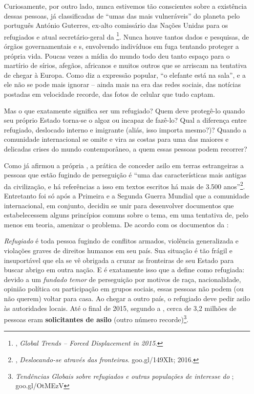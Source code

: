 Curiosamente, por outro lado, nunca estivemos tão conscientes sobre a
existência dessas pessoas, já classificadas de ``umas das mais
vulneráveis'' do planeta pelo português António Guterres, ex-alto
comissário das Nações Unidas para os refugiados e atual secretário-geral
da \footnote{, \emph{Global Trends -- Forced Displacement in
  2015}.}.  Nunca houve tantos dados e pesquisas, de órgãos
governamentais e s, envolvendo indivíduos em fuga tentando proteger a
própria vida. Poucas vezes a mídia do mundo todo deu tanto espaço para o
martírio de sírios, afegãos, africanos e muitos outros que se arriscam
na tentativa de chegar à Europa. Como diz a expressão popular, ``o
elefante está na sala'', e a ele não se pode mais ignorar -- ainda mais
na era das redes sociais, das notícias postadas em velocidade recorde,
das fotos de celular que tudo captam.

Mas o que exatamente significa ser um refugiado? Quem deve protegê-lo
quando seu próprio Estado torna-se o algoz ou incapaz de fazê-lo? Qual a
diferença entre refugiado, deslocado interno e imigrante (aliás, isso
importa mesmo?)? Quando a comunidade internacional se omite e vira as
costas para uma das maiores e delicadas crises do mundo contemporâneo, a
quem essas pessoas podem recorrer?

Como já afirmou a própria , a prática de conceder asilo em terras
estrangeiras a pessoas que estão fugindo de perseguição é ``uma das
características mais antigas da civilização, e há referências a isso em
textos escritos há mais de 3.500 anos''\footnote{,
  \emph{Deslocando-se através das fronteiras}.
  {goo.gl/149XIt};
  2016.}. Entretanto foi só após a
Primeira e a Segunda Guerra Mundial que a comunidade internacional, em
conjunto, decidiu se unir para desenvolver documentos que estabelecessem
alguns princípios comuns sobre o tema, em uma tentativa de, pelo menos
em teoria, amenizar o problema. De acordo com os documentos da :

\textit{Refugiado} é toda pessoa fugindo de conflitos armados, violência
generalizada e violações graves de direitos humanos em seu país. Sua
situação é tão frágil e insuportável que ela se vê obrigada a cruzar as
fronteiras de seu Estado para buscar abrigo em outra nação. E é
exatamente isso que a define como refugiada: devido a um \emph{fundado
temor} de perseguição por motivos de raça, nacionalidade, opinião
política ou participação em grupos sociais, essas pessoas não podem (ou
não querem) voltar para casa. Ao chegar a outro país, o refugiado deve
pedir asilo às autoridades locais. Até o final de 2015, segundo a ,
cerca de 3,2 milhões de pessoas eram \textbf{solicitantes de asilo}
(outro número recorde)\footnote{\emph{Tendências Globais sobre
  refugiados e outras populações de interesse do };
  goo.gl/OtMEzV}.


